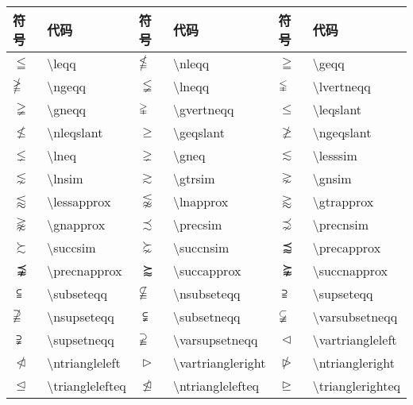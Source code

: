 \documentclass[UTF8,fontset=ubuntu]{ctexart}
\begin{document}
\begin{table}[H]
	\begin{tabular}{l l l l l l}
		\hline
		符号 & 代码 & 符号 & 代码 & 符号 & 代码\\\hline
		$\leqq$ & \textbackslash leqq & $\nleqq$ & \textbackslash nleqq & $\geqq$ & \textbackslash geqq\\
		$\ngeqq$ & \textbackslash ngeqq & $\lneqq$ & \textbackslash lneqq & $\lvertneqq$ & \textbackslash lvertneqq\\
		$\gneqq$ & \textbackslash gneqq & $\gvertneqq$ & \textbackslash gvertneqq &	$\leqslant$ & \textbackslash leqslant\\
		$\nleqslant$ & \textbackslash nleqslant & $\geqslant$ & \textbackslash geqslant & $\ngeqslant$ & \textbackslash ngeqslant\\
		$\lneq$ & \textbackslash lneq & $\gneq$ & \textbackslash gneq & $\lesssim$ & \textbackslash lesssim\\
		$\lnsim$ & \textbackslash lnsim & $\gtrsim$ & \textbackslash gtrsim & $\gnsim$ & \textbackslash gnsim\\
		$\lessapprox$ & \textbackslash lessapprox& $\lnapprox$ & \textbackslash lnapprox & $\gtrapprox$ & \textbackslash gtrapprox\\
		$\gnapprox$ & \textbackslash gnapprox & $\precsim$ & \textbackslash precsim & $\precnsim$ & \textbackslash precnsim\\
		$\succsim$ & \textbackslash succsim & $\succnsim$ & \textbackslash succnsim & $\precapprox$ & \textbackslash precapprox\\
		$\precnapprox$ & \textbackslash precnapprox & $\succapprox$ & \textbackslash succapprox & $\succnapprox$ & \textbackslash succnapprox\\
		$\subseteqq$ & \textbackslash subseteqq & $\nsubseteqq$ & \textbackslash nsubseteqq & $\supseteqq$ & \textbackslash supseteqq\\
		$\nsupseteqq$ & \textbackslash nsupseteqq & $\subsetneqq$ & \textbackslash subsetneqq & $\varsubsetneqq$ & \textbackslash varsubsetneqq\\
		$\supsetneqq$ & \textbackslash supsetneqq & $\varsupsetneqq$ & \textbackslash varsupsetneqq & $\vartriangleleft$ & \textbackslash vartriangleleft\\
		$\ntriangleleft$ & \textbackslash ntriangleleft & $\vartriangleright$ & \textbackslash vartriangleright & $\ntriangleright$ & \textbackslash ntriangleright\\
		$\trianglelefteq$ & \textbackslash trianglelefteq & $\ntrianglelefteq$ & \textbackslash ntrianglelefteq & $\trianglerighteq$ & \textbackslash trianglerighteq\\

\end{tabular}
\end{table}
\end{document}
